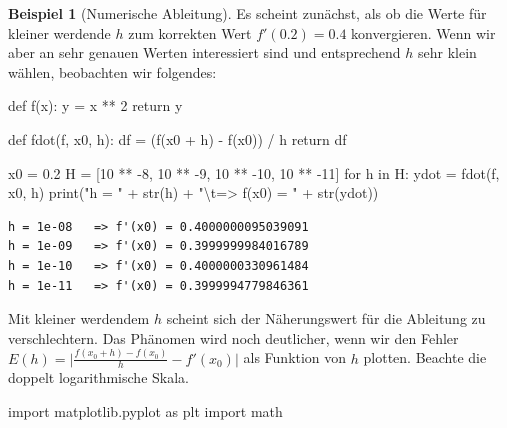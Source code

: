 \documentclass[
  letterpaper,
  DIV=11,
  oneside]{scrreprt}
\newenvironment{Shaded}{\begin{snugshade}}{\end{snugshade}}
\newcommand{\BuiltInTok}[1]{\textcolor[rgb]{0.00,0.23,0.31}{#1}}
\newcommand{\CharTok}[1]{\textcolor[rgb]{0.13,0.47,0.30}{#1}}
\newcommand{\ControlFlowTok}[1]{\textcolor[rgb]{0.00,0.23,0.31}{#1}}
\newcommand{\DecValTok}[1]{\textcolor[rgb]{0.68,0.00,0.00}{#1}}
\newcommand{\FloatTok}[1]{\textcolor[rgb]{0.68,0.00,0.00}{#1}}
\newcommand{\ImportTok}[1]{\textcolor[rgb]{0.00,0.46,0.62}{#1}}
\newcommand{\KeywordTok}[1]{\textcolor[rgb]{0.00,0.23,0.31}{#1}}
\newcommand{\NormalTok}[1]{\textcolor[rgb]{0.00,0.23,0.31}{#1}}
\newcommand{\OperatorTok}[1]{\textcolor[rgb]{0.37,0.37,0.37}{#1}}
\newcommand{\StringTok}[1]{\textcolor[rgb]{0.13,0.47,0.30}{#1}}
\theoremstyle{definition}
\theoremstyle{definition}
\newtheorem{example}{Beispiel}[chapter]
\theoremstyle{remark}
\begin{document}
\begin{example}[Numerische Ableitung]
Es scheint zunächst, als ob die Werte für kleiner werdende \(h\) zum
korrekten Wert \(f'(0.2)=0.4\) konvergieren. Wenn wir aber an sehr
genauen Werten interessiert sind und entsprechend \(h\) sehr klein
wählen, beobachten wir folgendes:

\begin{Shaded}
\begin{Highlighting}[]
\KeywordTok{def}\NormalTok{ f(x):}
\NormalTok{    y }\OperatorTok{=}\NormalTok{ x }\OperatorTok{**} \DecValTok{2}
    \ControlFlowTok{return}\NormalTok{ y}

\KeywordTok{def}\NormalTok{ fdot(f, x0, h):}
\NormalTok{    df }\OperatorTok{=}\NormalTok{ (f(x0 }\OperatorTok{+}\NormalTok{ h) }\OperatorTok{{-}}\NormalTok{ f(x0)) }\OperatorTok{/}\NormalTok{ h}
    \ControlFlowTok{return}\NormalTok{ df}

\NormalTok{x0 }\OperatorTok{=} \FloatTok{0.2}
\NormalTok{H }\OperatorTok{=}\NormalTok{ [}\DecValTok{10} \OperatorTok{**} \OperatorTok{{-}}\DecValTok{8}\NormalTok{, }\DecValTok{10} \OperatorTok{**} \OperatorTok{{-}}\DecValTok{9}\NormalTok{, }\DecValTok{10} \OperatorTok{**} \OperatorTok{{-}}\DecValTok{10}\NormalTok{, }\DecValTok{10} \OperatorTok{**} \OperatorTok{{-}}\DecValTok{11}\NormalTok{]}
\ControlFlowTok{for}\NormalTok{ h }\KeywordTok{in}\NormalTok{ H:}
\NormalTok{    ydot }\OperatorTok{=}\NormalTok{ fdot(f, x0, h)}
    \BuiltInTok{print}\NormalTok{(}\StringTok{"h = "} \OperatorTok{+} \BuiltInTok{str}\NormalTok{(h) }\OperatorTok{+} \StringTok{"}\CharTok{\textbackslash{}t}\StringTok{=\textgreater{} f\textquotesingle{}(x0) = "} \OperatorTok{+} \BuiltInTok{str}\NormalTok{(ydot))}
\end{Highlighting}
\end{Shaded}

\begin{verbatim}
h = 1e-08   => f'(x0) = 0.4000000095039091
h = 1e-09   => f'(x0) = 0.3999999984016789
h = 1e-10   => f'(x0) = 0.4000000330961484
h = 1e-11   => f'(x0) = 0.3999994779846361
\end{verbatim}

Mit kleiner werdendem \(h\) scheint sich der Näherungswert für die
Ableitung zu verschlechtern. Das Phänomen wird noch deutlicher, wenn wir
den Fehler \(E(h) = \lvert\frac{f(x_0+h)-f(x_0)}{h} - f'(x_0)\rvert\)
als Funktion von \(h\) plotten. Beachte die doppelt logarithmische
Skala.

\begin{Shaded}
\begin{Highlighting}[]
\ImportTok{import}\NormalTok{ matplotlib.pyplot }\ImportTok{as}\NormalTok{ plt}
\ImportTok{import}\NormalTok{ math}


\end{Highlighting}
\end{Shaded}
\end{example}
\end{document}
